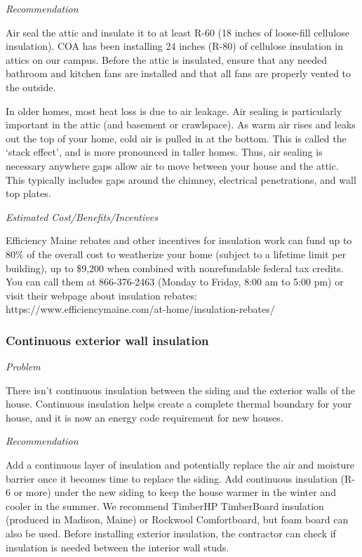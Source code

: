 \documentclass[
  letterpaper,
  DIV=11,
  numbers=noendperiod]{scrartcl}
\begin{document}
\emph{Recommendation}

Air seal the attic and insulate it to at least R-60 (18 inches of
loose-fill cellulose insulation). COA has been installing 24 inches
(R-80) of cellulose insulation in attics on our campus. Before the attic
is insulated, ensure that any needed bathroom and kitchen fans are
installed and that all fans are properly vented to the outside.

In older homes, most heat loss is due to air leakage. Air sealing is
particularly important in the attic (and basement or crawlspace). As
warm air rises and leaks out the top of your home, cold air is pulled in
at the bottom. This is called the `stack effect', and is more pronounced
in taller homes. Thus, air sealing is necessary anywhere gaps allow air
to move between your house and the attic. This typically includes gaps
around the chimney, electrical penetrations, and wall top plates.

\emph{Estimated Cost/Benefits/Incentives}

Efficiency Maine rebates and other incentives for insulation work can
fund up to 80\% of the overall cost to weatherize your home (subject to
a lifetime limit per building), up to \$9,200 when combined with
nonrefundable federal tax credits. You can call them at 866-376-2463
(Monday to Friday, 8:00 am to 5:00 pm) or visit their webpage about
insulation rebates:
https://www.efficiencymaine.com/at-home/insulation-rebates/

\subsubsection{Continuous exterior wall
insulation}\label{continuous-exterior-wall-insulation}

\emph{Problem}

There isn't continuous insulation between the siding and the exterior
walls of the house. Continuous insulation helps create a complete
thermal boundary for your house, and it is now an energy code
requirement for new houses.

\emph{Recommendation}

Add a continuous layer of insulation and potentially replace the air and
moisture barrier once it becomes time to replace the siding. Add
continuous insulation (R-6 or more) under the new siding to keep the
house warmer in the winter and cooler in the summer. We recommend
TimberHP TimberBoard insulation (produced in Madison, Maine) or Rockwool
Comfortboard, but foam board can also be used. Before installing
exterior insulation, the contractor can check if insulation is needed
between the interior wall studs.
\end{document}
